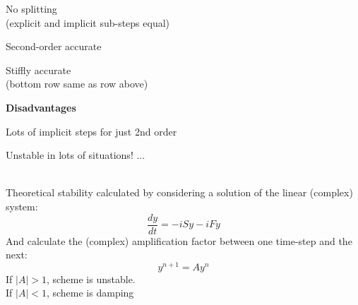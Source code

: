 \begin{slide}
\begin{minipage}{0.49\linewidth}
\begin{list0}
\item No splitting \\(explicit and implicit sub-steps equal)\pauseHS
\item Second-order accurate\pauseHS
\item Stiffly accurate \\(bottom row same as row above)\pauseHS
\end{list0}
\end{minipage}
%
\begin{minipage}{0.49\linewidth}
\centerline{\bf Disadvantages}\pauseHS
\begin{list0}
\item Lots of implicit steps for just 2nd order\pauseHS
\item Unstable in lots of situations! ...
\end{list0}
\end{minipage}
\end{slide}

\begin{slide}
\pauseHS

\ \\

Theoretical stability calculated by considering a solution of the linear (complex) system:
\[\frac{dy}{dt} = -iSy - iFy\]
\pauseHS
And calculate the (complex) amplification factor between one time-step and the next:
\[y^{n+1} = A y^n\]
\pauseHS
If $|A|>1$, scheme is unstable.\\
If $|A|<1$, scheme is damping

\end{slide}

